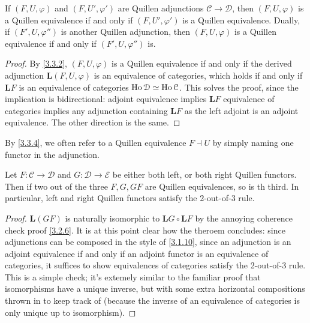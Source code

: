 \begin{corollary}\label{3.3.4}
	If $(F,U,\varphi)$ and $(F,U',\varphi')$ are Quillen adjunctions $\mathcal{C} \to \mathcal{D} $, then $(F,U,\varphi)$ is a Quillen equivalence if and only if $(F,U',\varphi')$ is a Quillen equivalence. Dually, if $(F',U,\varphi'')$ is another Quillen adjunction, then $(F,U,\varphi)$ is a Quillen equivalence if and only if $(F',U,\varphi'')$ is.
\end{corollary}
\begin{proof}
	By \cref{3.3.2}, $(F,U,\varphi)$ is a Quillen equivalence if and only if the derived adjunction $\mathbf{L} (F,U,\varphi)$ is an equivalence of categories, which holds if and only if $\mathbf{L} F$ is an equivalence of categories $\operatorname{Ho} \mathcal{D} \simeq\operatorname{Ho} \mathcal{C} $. This solves the proof, since the implication is bidirectional: adjoint equivalence implies $\mathbf{L} F$ equivalence of categories implies any adjunction containing $\mathbf{L} F$ as the left adjoint is an adjoint equivalence. The other direction is the same.
\end{proof}

\begin{terminology}\label{3.3.5}
	By \cref{3.3.4}, we often refer to a Quillen equivalence $F\dashv U$ by simply naming one functor in the adjunction.
\end{terminology}


\begin{corollary}\label{3.3.6}
	Let $F : \mathcal{C}  \to \mathcal{D} $ and $G : \mathcal{D}  \to \mathcal{E} $ be either both left, or both right Quillen functors. Then if two out of the three $F,G,GF$ are Quillen equivalences, so is th third. In particular, left and right Quillen functors satisfy the 2-out-of-3 rule.
\end{corollary}
\begin{proof}
	$\mathbf{L} (GF)$ is naturally isomorphic to $\mathbf{L} G\circ \mathbf{L} F$ by the annoying coherence check proof \cref{3.2.6}. It is at this point clear how the theroem concludes: since adjunctions can be composed in the style of \cref{3.1.10}, since an adjunction is an adjoint equivalence if and only if an adjoint functor is an equivalence of categories, it suffices to show equivalences of categories satisfy the 2-out-of-3 rule. This is a simple check; it's extemely similar to the familiar proof that isomorphisms have a unique inverse, but with some extra horizontal compositions thrown in to keep track of (because the inverse of an equivalence of categories is only unique up to isomorphism).
\end{proof}

